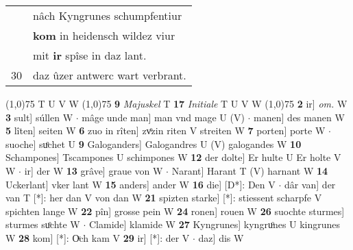 \documentclass[8pt,a4paper,notitlepage]{article}
\begin{document}
\begin{table}[ht]
\begin{minipage}[t]{0.5\linewidth}
\begin{tabular}{rl}
 & nâch Kyngrunes schumpfentiur\\ 
 & \textbf{kom} in heidensch wildez viur\\ 
 & mit \textbf{ir} spîse in daz lant.\\ 
30 & daz ûzer antwerc wart verbrant.\\ 
\end{tabular}
\scriptsize
\line(1,0){75} \newline
T U V W \newline
\line(1,0){75} \newline
\textbf{9} \textit{Majuskel} T  \textbf{17} \textit{Initiale} T U V W  \newline
\line(1,0){75} \newline
\textbf{2} ir] \textit{om.} W \textbf{3} sult] súllen W  $\cdot$ mâge unde man] man vnd mage U (V)  $\cdot$ manen] des manen W \textbf{5} lîten] seiten W \textbf{6} zuo in rîten] zvͦzin riten V streiten W \textbf{7} porten] porte W  $\cdot$ suoche] suͦchet U \textbf{9} Galoganders] Galogandres U (V) galogandes W \textbf{10} Schampones] Tscampones U schimpones W \textbf{12} der dolte] Er hulte U Er holte V W  $\cdot$ ir] der W \textbf{13} grâve] graue von W  $\cdot$ Narant] Harant T (V) harnant W \textbf{14} Uckerlant] vker lant W \textbf{15} anders] ander W \textbf{16} die] [D*]: Den V  $\cdot$ dâr van] der van T [*]: her dan V von dan W \textbf{21} spizten starke] [*]: stiessent scharpfe V spichten lange W \textbf{22} pîn] grosse pein W \textbf{24} ronen] rouen W \textbf{26} suochte sturmes] sturmes suͦchte W  $\cdot$ Clamide] klamide W \textbf{27} Kyngrunes] kyngruͦnes U kingrunes W \textbf{28} kom] [*]: Oͮch kam V \textbf{29} ir] [*]: der V  $\cdot$ daz] dis W \newline
\end{minipage}
\end{table}
\end{document}
